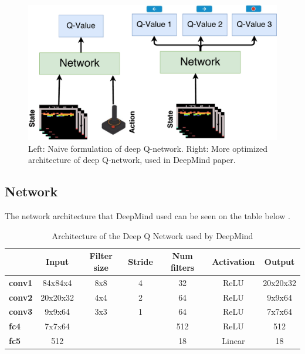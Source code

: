 \begin{figure}[H]
	\centering
	\includegraphics[width=1\textwidth]{Figures/Architecture/DQN/DQN_two_approach.pdf}
	\caption{Left: Naive formulation of deep Q-network. Right: More optimized architecture of deep Q-network, used in DeepMind paper.} 
	\label{fig:DQN_two_approach}
\end{figure}    

\subsection{Network}
The network architecture that DeepMind used can be seen on the table below . 

\begin{table}[H]
	\centering
	\caption{Architecture of the Deep Q Network used by DeepMind}
	\label{tab:DQN_network}
	\begin{tabular}{|l|c|c|c|c|c|c|}
		\hline
		\rowcolor[HTML]{9B9B9B} 
		\multicolumn{1}{|c|}{\cellcolor[HTML]{9B9B9B}\textbf{Layer}} & \textbf{Input} & \textbf{Filter size} & \textbf{Stride} & \textbf{Num filters} & \textbf{Activation} & \textbf{Output} \\ \hline
		\cellcolor[HTML]{FFFFFF}\textbf{conv1}                       & 84x84x4        & 8x8                  & 4               & 32                   & ReLU                & 20x20x32        \\ \hline
		\rowcolor[HTML]{C0C0C0} 
		\textbf{conv2}                                               & 20x20x32       & 4x4                  & 2               & 64                   & ReLU                & 9x9x64          \\ \hline
		\cellcolor[HTML]{FFFFFF}\textbf{conv3}                       & 9x9x64         & 3x3                  & 1               & 64                   & ReLU                & 7x7x64          \\ \hline
		\rowcolor[HTML]{C0C0C0} 
		\textbf{fc4}                                                 & 7x7x64         &                      &                 & 512                  & ReLU                & 512             \\ \hline
		\cellcolor[HTML]{FFFFFF}\textbf{fc5}                         & 512            &                      &                 & 18                   & Linear              & 18              \\ \hline
	\end{tabular}
\end{table}

